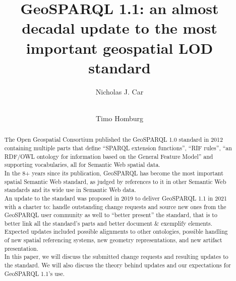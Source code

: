\documentclass[runningheads]{llncs}
\begin{document}
\title{GeoSPARQL 1.1: an almost decadal update to the most important geospatial LOD standard}

\author{
    Nicholas J. Car \and \\
    Timo Homburg %
}



\maketitle

\begin{abstract}
The Open Geospatial Consortium published the GeoSPARQL 1.0 standard \cite{open2012ogc} in 2012 containing multiple 
parts that define ``SPARQL extension functions'', ``RIF rules''\cite{kifer2013rif}, ``an RDF/OWL ontology for 
information based on the General Feature Model'' and supporting vocabularies, all for Semantic 
Web spatial data.\\

In the 8+ years since its publication, GeoSPARQL has become the most important spatial Semantic 
Web standard, as judged by references to it in other Semantic Web standards and its wide use in 
Semantic Web data.\\

An update to the standard was proposed in 2019 to deliver GeoSPARQL 1.1 in 2021 with a charter\cite{abhayaratna2020ogc} to: 
handle outstanding change requests and source new ones from the GeoSPARQL user community as well 
to ``better present'' the standard, that is to better link all the standard’s parts and better 
document \& exemplify elements. Expected updates included possible alignments to other ontologies, 
possible handling of new spatial referencing systems, new geometry representations, and new artifact 
presentation.\\

In this paper, we will discuss the submitted change requests and resulting updates to the standard. 
We will also discuss the theory behind updates and our expectations for GeoSPARQL 1.1's use.

\end{abstract}
\end{document}
